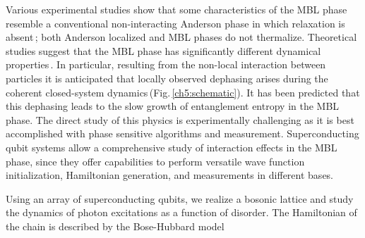 Various experimental studies show that some characteristics of the MBL phase resemble a conventional non-interacting Anderson phase in which relaxation is absent\,\cite{BlochMBL2015, demarco2015, Monroe2015, GrossScience2016, Bordia2017, Roushan2018, Lukin2019}; both Anderson localized and MBL phases do not thermalize. Theoretical studies suggest that the MBL phase has significantly different dynamical properties\,\cite{Huse2007, Bardarson2012, Serbyn2013b, Huse2014, Serbyn2013, KnapPRL2014, Antonello2017, Serbyn2014, Yasaman2015,  Gopalakrishnan2015, Serbyn2015, Altman2015, ImbriePRL2016}. In particular, resulting from the non-local interaction between particles it is anticipated that locally observed dephasing arises during the coherent closed-system dynamics\,(Fig.\,\ref{ch5:schematic}). It has been predicted that this dephasing leads to the slow growth of entanglement entropy in the MBL phase. The direct study of this physics is experimentally challenging as it is best accomplished with phase sensitive algorithms and measurement. Superconducting qubit systems allow a comprehensive study of interaction effects in the MBL phase, since they offer capabilities to perform versatile wave function initialization, Hamiltonian generation, and measurements in different bases.

Using an array of superconducting qubits, we realize a bosonic lattice and study the dynamics of photon excitations as a function of disorder. The Hamiltonian of the chain is described by the Bose-Hubbard model



